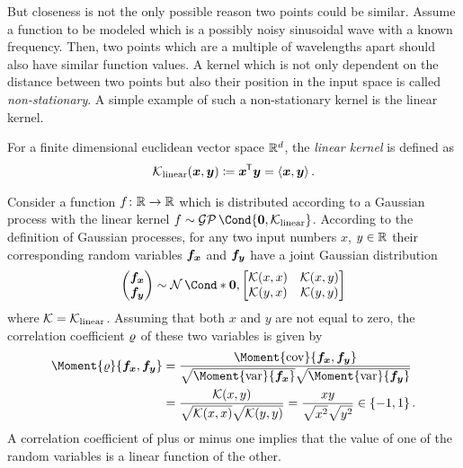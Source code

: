 But closeness is not the only possible reason two points could be similar.
Assume a function to be modeled which is a possibly noisy sinusoidal wave with a known frequency.
Then, two points which are a multiple of wavelengths apart should also have similar function values.
A kernel which is not only dependent on the distance between two points but also their position in the input space is called \emph{non-stationary}.
A simple example of such a non-stationary kernel is the linear kernel.
\begin{definition}
    For a finite dimensional euclidean vector space $\mathbb{R}^d$, the \emph{linear kernel} is defined as
    \begin{align}
        \operatorname{\mathcal{K}}_{\text{linear}}(\bm{x}, \bm{y}) \coloneqq \bm{x}^{\mkern-1.5mu\mathsf{T}} \bm{y} = \left\langle \bm{x}, \bm{y}\right\rangle.
    \end{align}
\end{definition}
Consider a function $f \colon \mathbb{R} \to \mathbb{R}$ which is distributed according to a Gaussian process with the linear kernel $f \sim \GP\Cond{\mat{0}, \K_{\text{linear}}}$.
According to the definition of Gaussian processes, for any two input numbers $x$, $y \in \mathbb{R}$ their corresponding random variables $\bm{f_x}$ and $\bm{f_y}$ have a joint Gaussian distribution
\begin{align}
    \begin{pmatrix}
        \rv{f_x} \\ \rv{f_y}
    \end{pmatrix} \sim \Gaussian*{\mat{0}, \begin{bmatrix}
        \K(x, x) & \K(x, y) \\
        \K(y, x) & \K(y, y)
    \end{bmatrix}}
\end{align}
where $\operatorname{\mathcal{K}} = \operatorname{\mathcal{K}}_{\text{linear}}$.
Assuming that both $x$ and $y$ are not equal to zero, the correlation coefficient $\corr$ of these two variables is given by
\begin{align}
    \begin{split}
        \Moment{\corr}{\rv{f_x}, \rv{f_y}} &= \frac{\Moment{\cov}{\rv{f_x}, \rv{f_y}}}{\sqrt{\Moment{\var}{\rv{f_x}\vphantom{\rv{f_y}}}}\sqrt{\Moment{\var}{\rv{f_y}}}} \\
              &= \frac{\K(x, y)}{\sqrt{\K(x, x)} \sqrt{\K(y, y)}} = \frac{xy}{\sqrt{\vphantom{y^2}x^2}\sqrt{\vphantom{y^2}y^2}} \in \left\{ -1, 1 \right\}.
    \end{split}
\end{align}
A correlation coefficient of plus or minus one implies that the value of one of the random variables is a linear function of the other.
